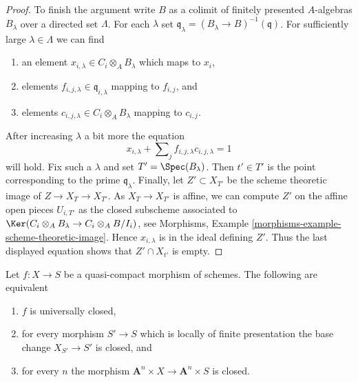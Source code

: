 \begin{proof}
\medskip\noindent
To finish the argument write $B$ as a colimit of finitely presented
$A$-algebras $B_\lambda$ over a directed set $\Lambda$.
For each $\lambda$ set
$\mathfrak q_\lambda = (B_\lambda \to B)^{-1}(\mathfrak q)$.
For sufficiently large $\lambda \in \Lambda$ we can find
\begin{enumerate}
\item an element
$x_{i, \lambda} \in C_i \otimes_A B_\lambda$ which maps to $x_i$,
\item elements $f_{i, j, \lambda} \in \mathfrak q_{i, \lambda}$
mapping to $f_{i, j}$, and
\item elements $c_{i, j, \lambda} \in C_i \otimes_A B_\lambda$
mapping to $c_{i, j}$.
\end{enumerate}
After increasing $\lambda$ a bit more the equation
$$
x_{i, \lambda} + \sum\nolimits_j f_{i, j, \lambda}c_{i, j, \lambda} = 1
$$
will hold. Fix such a $\lambda$ and set $T' = \Spec(B_\lambda)$.
Then $t' \in T'$ is the point corresponding to the prime $\mathfrak q_\lambda$.
Finally, let $Z' \subset X_{T'}$ be the scheme theoretic image of
$Z \to X_T \to X_{T'}$. As $X_T \to X_{T'}$ is affine, we can compute $Z'$
on the affine open pieces $U_{i, T'}$ as the closed subscheme associated
to $\Ker(C_i \otimes_A B_\lambda \to C_i \otimes_A B/I_i)$, see
Morphisms, Example \ref{morphisms-example-scheme-theoretic-image}.
Hence $x_{i, \lambda}$ is in the ideal defining $Z'$. Thus the last
displayed equation shows that $Z' \cap X_{t'}$ is empty.
\end{proof}

\begin{lemma}
\label{lemma-test-universally-closed}
Let $f : X \to S$ be a quasi-compact morphism of schemes.
The following are equivalent
\begin{enumerate}
\item $f$ is universally closed,
\item for every morphism $S' \to S$ which is locally of finite presentation
the base change $X_{S'} \to S'$ is closed, and
\item for every $n$ the morphism
$\mathbf{A}^n \times X \to \mathbf{A}^n \times S$
is closed.
\end{enumerate}
\end{lemma}

